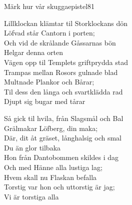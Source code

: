\begin{song}{Märk hur vår skugga}{epistel81}
\begin{vers}
Lillklockan klämtar til Storklockans dön\\
Löfvad står Cantorn i porten;\\
Och vid de skrålande Gåssarnas bön\\
Helgar denna orten\\
Vägen opp til Templets griftprydda stad\\
Trampas mellan Rosors gulnade blad\\
Multnade Plankor och Bårar;\\
Til dess den långa och svartklädda rad\\
Djupt sig bugar med tårar\\
\end{vers}
\begin{vers}
Så gick til hvila, från Slagsmål och Bal\\
Grälmakar Löfberg, din maka; \\
Där, dit åt gräset, långhalsig och smal\\
Du än glor tilbaka\\
Hon från Dantobommen skildes i dag\\
Och med Hänne alla lustiga lag;\\
Hvem skall nu Flaskan befalla\\
Torstig var hon och uttorstig är jag;\\
Vi är torstiga alla\\
\end{vers}
\end{song}

